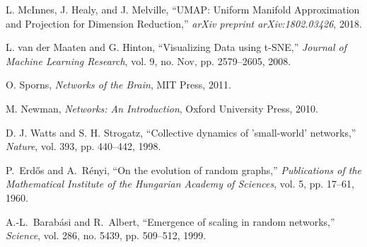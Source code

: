 \documentclass[conference]{IEEEtran}
\begin{document}

\begin{thebibliography}{99}

L. McInnes, J. Healy, and J. Melville, ``UMAP: Uniform Manifold Approximation and Projection for Dimension Reduction,'' \textit{arXiv preprint arXiv:1802.03426}, 2018.

L. van der Maaten and G. Hinton, ``Visualizing Data using t-SNE,'' \textit{Journal of Machine Learning Research}, vol. 9, no. Nov, pp. 2579--2605, 2008.

O. Sporns, \textit{Networks of the Brain}, MIT Press, 2011.

M. Newman, \textit{Networks: An Introduction}, Oxford University Press, 2010.

D. J. Watts and S. H. Strogatz, ``Collective dynamics of 'small-world' networks,'' \textit{Nature}, vol. 393, pp. 440--442, 1998.

P.~Erd\H{o}s and A.~R\'enyi, ``On the evolution of random graphs,'' \textit{Publications of the Mathematical Institute of the Hungarian Academy of Sciences}, vol. 5, pp. 17--61, 1960.

A.-L.~Barab\'asi and R.~Albert, ``Emergence of scaling in random networks,'' \textit{Science}, vol. 286, no. 5439, pp. 509--512, 1999.

\end{thebibliography}
\end{document}
